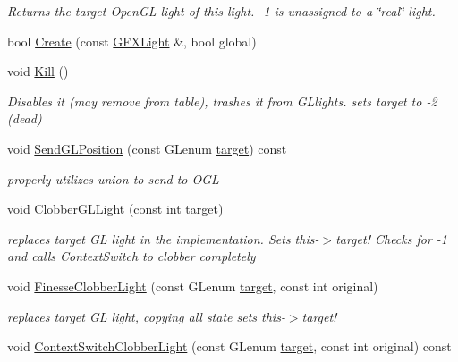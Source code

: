\begin{DoxyCompactItemize}
\begin{DoxyCompactList}\small\item\em Returns the target Open\+GL light of this light. -\/1 is unassigned to a \char`\"{}real\char`\"{} light. \end{DoxyCompactList}\item 
bool \hyperlink{classgfx__light_ac59f52b68d1631e537aea5b0397ddfe5}{Create} (const \hyperlink{classGFXLight}{G\+F\+X\+Light} \&, bool global)
\item 
void \hyperlink{classgfx__light_a176a34465b470ae5e50b0ebcb8e690a2}{Kill} ()\hypertarget{classgfx__light_a176a34465b470ae5e50b0ebcb8e690a2}{}\label{classgfx__light_a176a34465b470ae5e50b0ebcb8e690a2}

\begin{DoxyCompactList}\small\item\em Disables it (may remove from table), trashes it from G\+Llights. sets target to -\/2 (dead) \end{DoxyCompactList}\item 
void \hyperlink{classgfx__light_abb55026e68c8f5b8292d6d9915061913}{Send\+G\+L\+Position} (const G\+Lenum \hyperlink{classGFXLight_a4ff967e8c7144289a11061d4dc218aaa}{target}) const 
\begin{DoxyCompactList}\small\item\em properly utilizes union to send to O\+GL \end{DoxyCompactList}\item 
void \hyperlink{classgfx__light_af977a44d7ac73d054a866033c4e9cfbf}{Clobber\+G\+L\+Light} (const int \hyperlink{classGFXLight_a4ff967e8c7144289a11061d4dc218aaa}{target})\hypertarget{classgfx__light_af977a44d7ac73d054a866033c4e9cfbf}{}\label{classgfx__light_af977a44d7ac73d054a866033c4e9cfbf}

\begin{DoxyCompactList}\small\item\em replaces target GL light in the implementation. Sets this-\/$>$target! Checks for -\/1 and calls Context\+Switch to clobber completely \end{DoxyCompactList}\item 
void \hyperlink{classgfx__light_a093403b4e4c23264c4b56522ece80313}{Finesse\+Clobber\+Light} (const G\+Lenum \hyperlink{classGFXLight_a4ff967e8c7144289a11061d4dc218aaa}{target}, const int original)\hypertarget{classgfx__light_a093403b4e4c23264c4b56522ece80313}{}\label{classgfx__light_a093403b4e4c23264c4b56522ece80313}

\begin{DoxyCompactList}\small\item\em replaces target GL light, copying all state sets this-\/$>$target! \end{DoxyCompactList}\item 
void \hyperlink{classgfx__light_a7cc8477fa2d9d8544ce79513c769912e}{Context\+Switch\+Clobber\+Light} (const G\+Lenum \hyperlink{classGFXLight_a4ff967e8c7144289a11061d4dc218aaa}{target}, const int original) const \hypertarget{classgfx__light_a7cc8477fa2d9d8544ce79513c769912e}{}\label{classgfx__light_a7cc8477fa2d9d8544ce79513c769912e}


\end{DoxyCompactItemize}
